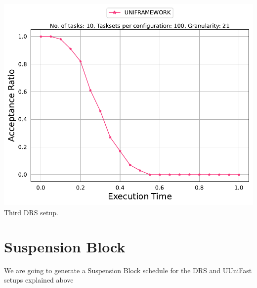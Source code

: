 \documentclass[]{article}
\begin{document}
\begin{minipage}[t]{0.48\linewidth}
		\includegraphics[width=\linewidth]{UNIFRAMEWORK_3rdSetup_DRS.pdf}
		Third DRS setup.
		\vspace{0.3cm}
	\end{minipage}


	\clearpage
	\section{Suspension Block}
{
\raggedleft We are going to generate a Suspension Block schedule for the DRS and UUniFast setups explained above \newline 
}
\end{document}
